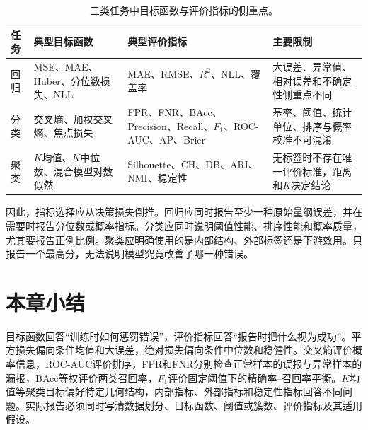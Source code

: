\begin{table}[htbp]
\centering
\caption{三类任务中目标函数与评价指标的侧重点。}
\label{tab:pipeline-objectives-metrics}
\begin{tabular}{m{}m{}m{}m{}}
\toprule
任务 & 典型目标函数 & 典型评价指标 & 主要限制 \\
\midrule
回归 & MSE、MAE、Huber、分位数损失、NLL & MAE、RMSE、$R^2$、NLL、覆盖率 & 大误差、异常值、相对误差和不确定性侧重点不同 \\
分类 & 交叉熵、加权交叉熵、焦点损失 & FPR、FNR、BAcc、Precision、Recall、$F_1$、ROC-AUC、AP、Brier & 基率、阈值、统计单位、排序与概率校准不可混淆 \\
聚类 & $K$均值、$K$中位数、混合模型对数似然 & Silhouette、CH、DB、ARI、NMI、稳定性 & 无标签时不存在唯一评价标准，距离和$K$决定结论 \\
\bottomrule
\end{tabular}
\end{table}

因此，指标选择应从决策损失倒推。回归应同时报告至少一种原始量纲误差，并在需要时报告分位数或概率指标。分类应同时说明阈值性能、排序性能和概率质量，尤其要报告正例比例。聚类应明确使用的是内部结构、外部标签还是下游效用。只报告一个最高分，无法说明模型究竟改善了哪一种错误。

\section*{本章小结}
目标函数回答“训练时如何惩罚错误”，评价指标回答“报告时把什么视为成功”。平方损失偏向条件均值和大误差，绝对损失偏向条件中位数和稳健性。交叉熵评价概率信息，ROC-AUC评价排序，FPR和FNR分别检查正常样本的误报与异常样本的漏报，BAcc等权评价两类召回率，$F_1$评价固定阈值下的精确率--召回率平衡。$K$均值等聚类目标偏好特定几何结构，内部指标、外部指标和稳定性指标回答不同问题。实际报告必须同时写清数据划分、目标函数、阈值或簇数、评价指标及其适用假设。
